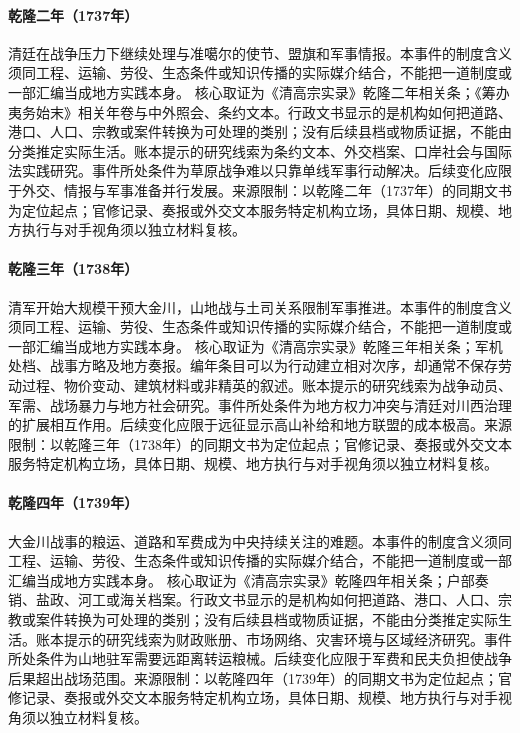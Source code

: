 \hypertarget{civic:EQ-1737-Dzungar-NEGOTIATION}{}\paragraph{乾隆二年（1737年）}清廷在战争压力下继续处理与准噶尔的使节、盟旗和军事情报。本事件的制度含义须同工程、运输、劳役、生态条件或知识传播的实际媒介结合，不能把一道制度或一部汇编当成地方实践本身。 核心取证为《清高宗实录》乾隆二年相关条；《筹办夷务始末》相关年卷与中外照会、条约文本。行政文书显示的是机构如何把道路、港口、人口、宗教或案件转换为可处理的类别；没有后续县档或物质证据，不能由分类推定实际生活。账本提示的研究线索为条约文本、外交档案、口岸社会与国际法实践研究。事件所处条件为草原战争难以只靠单线军事行动解决。后续变化应限于外交、情报与军事准备并行发展。来源限制：以乾隆二年（1737年）的同期文书为定位起点；官修记录、奏报或外交文本服务特定机构立场，具体日期、规模、地方执行与对手视角须以独立材料复核。
\hypertarget{civic:EQ-1738-FIRST-JINCHUAN-WAR}{}\paragraph{乾隆三年（1738年）}清军开始大规模干预大金川，山地战与土司关系限制军事推进。本事件的制度含义须同工程、运输、劳役、生态条件或知识传播的实际媒介结合，不能把一道制度或一部汇编当成地方实践本身。 核心取证为《清高宗实录》乾隆三年相关条；军机处档、战事方略及地方奏报。编年条目可以为行动建立相对次序，却通常不保存劳动过程、物价变动、建筑材料或非精英的叙述。账本提示的研究线索为战争动员、军需、战场暴力与地方社会研究。事件所处条件为地方权力冲突与清廷对川西治理的扩展相互作用。后续变化应限于远征显示高山补给和地方联盟的成本极高。来源限制：以乾隆三年（1738年）的同期文书为定位起点；官修记录、奏报或外交文本服务特定机构立场，具体日期、规模、地方执行与对手视角须以独立材料复核。
\hypertarget{civic:EQ-1739-JINCHUAN-SUPPLY}{}\paragraph{乾隆四年（1739年）}大金川战事的粮运、道路和军费成为中央持续关注的难题。本事件的制度含义须同工程、运输、劳役、生态条件或知识传播的实际媒介结合，不能把一道制度或一部汇编当成地方实践本身。 核心取证为《清高宗实录》乾隆四年相关条；户部奏销、盐政、河工或海关档案。行政文书显示的是机构如何把道路、港口、人口、宗教或案件转换为可处理的类别；没有后续县档或物质证据，不能由分类推定实际生活。账本提示的研究线索为财政账册、市场网络、灾害环境与区域经济研究。事件所处条件为山地驻军需要远距离转运粮械。后续变化应限于军费和民夫负担使战争后果超出战场范围。来源限制：以乾隆四年（1739年）的同期文书为定位起点；官修记录、奏报或外交文本服务特定机构立场，具体日期、规模、地方执行与对手视角须以独立材料复核。
